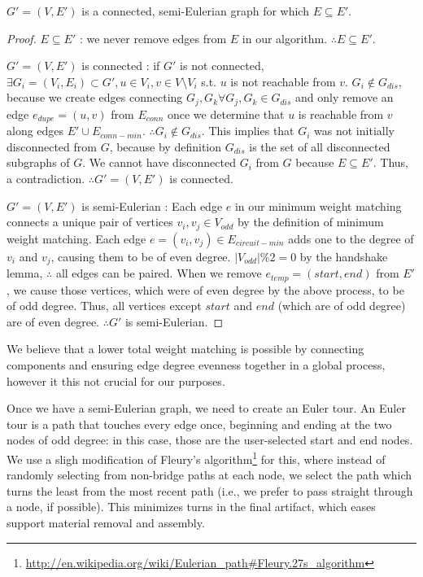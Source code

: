\begin{theorem}
 $G' = (V, E')$ is a connected, semi-Eulerian graph for which $E \subseteq E'$.
\end{theorem}
\begin{proof}
$E \subseteq E'$ : we never remove edges from $E$ in our algorithm.  $\therefore E \subseteq E'$.

$G' = (V, E')$ is connected : if $G'$ is not connected, $\exists G_i = (V_i, E_i) \subset G', u \in V_i, v\in V \setminus V_i$ s.t. $u$ is not reachable from $v$.  $G_i \not\in G_{dis}$, because we create edges connecting $G_j, G_k \forall G_j, G_k \in G_{dis}$ and only remove an edge $e_{dupe} = (u, v)$ from $E_{conn}$ once we determine that $u$ is reachable from $v$ along edges $E' \cup E_{conn-min}$.  $\therefore G_i \not\in G_{dis}$.  This implies that $G_i$ was not initially disconnected from $G$, because by definition $G_{dis}$ is the set of all disconnected subgraphs of $G$.  We cannot have disconnected $G_i$ from $G$ because $E \subseteq E'$.  Thus, a contradiction.  $\therefore G' = (V, E')$ is connected.

$G' = (V, E')$ is semi-Eulerian : Each edge $e$ in our minimum weight matching connects a unique pair of vertices $v_i, v_j \in V_{odd}$ by the definition of minimum weight matching.  Each edge $e = (v_i, v_j) \in E_{circuit-min}$ adds one to the degree of $v_i$ and $v_j$, causing them to be of even degree. $|V_{odd}| \% 2 = 0$ by the handshake lemma, $\therefore$ all edges can be paired.  When we remove $e_{temp} = (start, end)$ from $E'$, we cause those vertices, which were of even degree by the above process, to be of odd degree.  Thus, all vertices except $start$ and $end$ (which are of odd degree) are of even degree.  $\therefore G'$ is semi-Eulerian.
\end{proof}

We believe that a lower total weight matching is possible by connecting components and ensuring edge degree evenness together in a global process, however it this not crucial for our purposes.

Once we have a semi-Eulerian graph, we need to create an Euler tour.  An Euler tour is a path that touches every edge once, beginning and ending at the two nodes of odd degree: in this case, those are the user-selected start and end nodes.  We use a sligh modification of Fleury's algorithm\footnote{\url{http://en.wikipedia.org/wiki/Eulerian_path\#Fleury.27s_algorithm}} for this, where instead of randomly selecting from non-bridge paths at each node, we select the path which turns the least from the most recent path (i.e., we prefer to pass straight through a node, if possible).  This minimizes turns in the final artifact, which eases support material removal and assembly.

